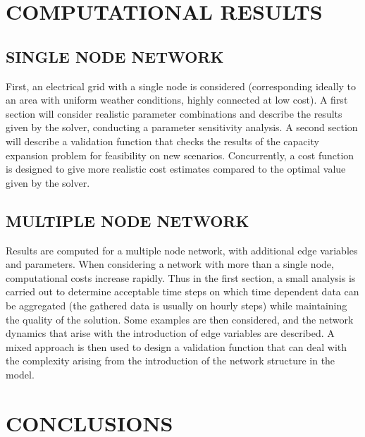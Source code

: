 \section{COMPUTATIONAL RESULTS}
\subsection{SINGLE NODE NETWORK}
First, an electrical grid with a single node is considered (corresponding ideally to an area with uniform
weather conditions, highly connected at low cost). A first section will consider realistic parameter
combinations and describe the results given by the solver, conducting a parameter sensitivity analysis. A
second section will describe a validation function that checks the results of the capacity expansion
problem for feasibility on new scenarios. Concurrently, a cost function is designed to give more realistic
cost estimates compared to the optimal value given by the solver.
\subsection{MULTIPLE NODE NETWORK}
Results are computed for a multiple node network, with additional edge variables and parameters. When
considering a network with more than a single node, computational costs increase rapidly. Thus in the
first section, a small analysis is carried out to determine acceptable time steps on which time dependent
data can be aggregated (the gathered data is usually on hourly steps) while maintaining the quality of the
solution. Some examples are then considered, and the network dynamics that arise with the introduction
of edge variables are described. A mixed approach is then used to design a validation function that can
deal with the complexity arising from the introduction of the network structure in the model.
\section{CONCLUSIONS}



%
%


